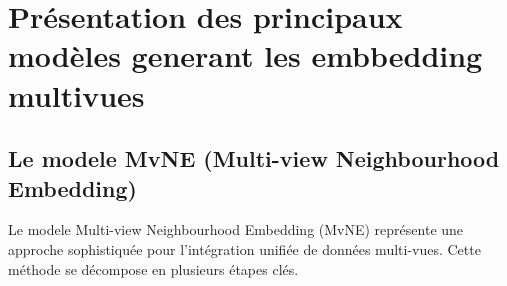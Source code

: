       
        
        

    \section{Présentation des principaux modèles generant les embbedding multivues}


            \subsection{Le modele MvNE (Multi-view Neighbourhood Embedding) }
            
            Le modele  Multi-view Neighbourhood Embedding (MvNE) représente une approche sophistiquée pour l'intégration unifiée de données multi-vues. Cette méthode se décompose en plusieurs étapes clés.
